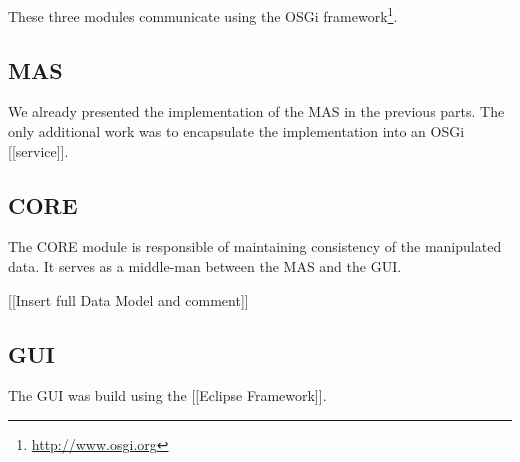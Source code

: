 These three modules communicate using the OSGi framework\footnote{\url{http://www.osgi.org}}.

\subsection{MAS}

We already presented the implementation of the MAS in the previous parts. The only additional work was to encapsulate the implementation into an OSGi [[service]].

\subsection{CORE}

The CORE module is responsible of maintaining consistency of the manipulated data. It serves as a middle-man between the MAS and the GUI.

[[Insert full Data Model and comment]]

\subsection{GUI}

The GUI was build using the [[Eclipse Framework]].


